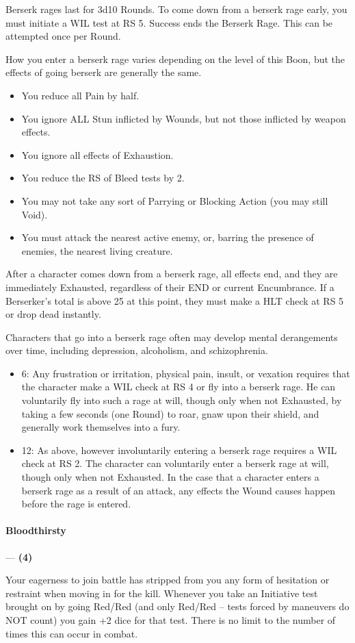 \documentclass[oneside,11pt,english]{book}
\begin{document}
Berserk rages last for 3d10 Rounds. To come down from a berserk rage early, you must initiate a WIL 
test at RS 5. Success ends the Berserk Rage. This can be attempted once per Round. 


How you enter a berserk rage varies depending on the level of this Boon, but the effects of going berserk are generally the same. 
\begin{itemize}
\item You reduce all Pain by half. 
\item You ignore ALL Stun inflicted by Wounds, but not those inflicted by weapon effects. 
\item You ignore all effects of Exhaustion. 
\item You reduce the RS of Bleed tests by 2. 
\item You may not take any sort of Parrying or Blocking Action (you may still Void). 
\item You must attack the nearest active enemy, or, barring the presence of enemies, the nearest living 
creature. 
\end{itemize}
After a character comes down from a berserk rage, all effects end, and they are immediately Exhausted, 
regardless of their END or current Encumbrance. If a Berserker's  total is above 25 at this 
point, they must make a HLT check at RS 5 or drop dead instantly. 


Characters that go into a berserk rage often may develop mental derangements over time, including 
depression, alcoholism, and schizophrenia. 
\begin{itemize}
\item 6: Any frustration or irritation, physical pain, insult, or vexation requires that the character make a WIL check at RS 4 or fly into a berserk rage. He can voluntarily fly into such a rage at will, though only when not Exhausted, by taking a few seconds (one Round) to roar, gnaw upon their shield, and generally work 
themselves into a fury.
\item 12: As above, however involuntarily entering a berserk rage requires a WIL check at RS 2. The character can voluntarily enter a berserk rage at will, though only when not Exhausted. In the case that a character enters a berserk rage as a result of an attack, any effects the Wound causes happen before the rage is entered.
\end{itemize}
\paragraph{\label{boon:Bloodthirsty}Bloodthirsty}---\quad \textbf{ (4)}\par
Your eagerness to join battle has stripped from you any form of hesitation or restraint when moving in for 
the kill. Whenever you take an Initiative test brought on by going Red/Red (and only Red/Red – tests forced by maneuvers do NOT count) you gain +2 dice for that test. There is no limit to the number of 
times this can occur in combat.
\end{document}
